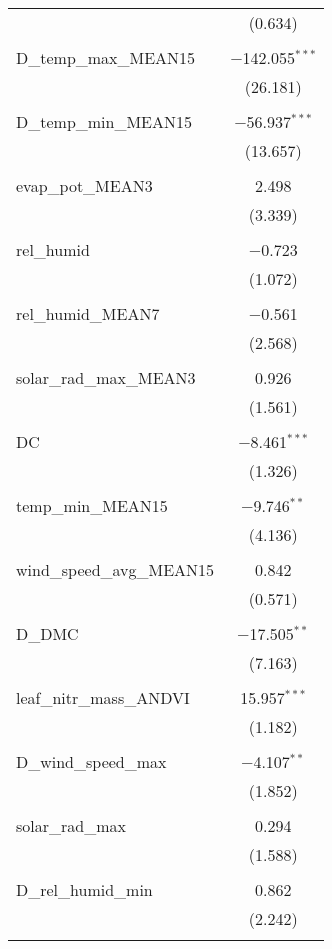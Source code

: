 \begin{table}[!htbp]
\begin{tabular}{@{\extracolsep{5pt}}lc}
  & (0.634) \\ 
  & \\ 
 D\_temp\_max\_MEAN15 & $-$142.055$^{***}$ \\ 
  & (26.181) \\ 
  & \\ 
 D\_temp\_min\_MEAN15 & $-$56.937$^{***}$ \\ 
  & (13.657) \\ 
  & \\ 
 evap\_pot\_MEAN3 & 2.498 \\ 
  & (3.339) \\ 
  & \\ 
 rel\_humid & $-$0.723 \\ 
  & (1.072) \\ 
  & \\ 
 rel\_humid\_MEAN7 & $-$0.561 \\ 
  & (2.568) \\ 
  & \\ 
 solar\_rad\_max\_MEAN3 & 0.926 \\ 
  & (1.561) \\ 
  & \\ 
 DC & $-$8.461$^{***}$ \\ 
  & (1.326) \\ 
  & \\ 
 temp\_min\_MEAN15 & $-$9.746$^{**}$ \\ 
  & (4.136) \\ 
  & \\ 
 wind\_speed\_avg\_MEAN15 & 0.842 \\ 
  & (0.571) \\ 
  & \\ 
 D\_DMC & $-$17.505$^{**}$ \\ 
  & (7.163) \\ 
  & \\ 
 leaf\_nitr\_mass\_ANDVI & 15.957$^{***}$ \\ 
  & (1.182) \\ 
  & \\ 
 D\_wind\_speed\_max & $-$4.107$^{**}$ \\ 
  & (1.852) \\ 
  & \\ 
 solar\_rad\_max & 0.294 \\ 
  & (1.588) \\ 
  & \\ 
 D\_rel\_humid\_min & 0.862 \\ 
  & (2.242) \\ 
  & \\ 

\end{tabular}
\end{table}
